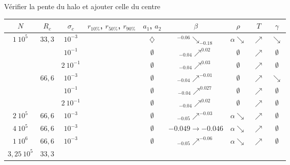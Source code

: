 \begin{table}[htbp]
	Vérifier la pente du halo et ajouter celle du centre
	\centering
		\begin{tabular}{|c|c|c|c|c|c|c|c|c|}
			\hline $N$ & $R_c$ & $\sigma_c$ & $r_{10\%}$, $r_{50\%}$, $r_{90\%}$ & $a_1$, $a_2$ & $\beta$ & $\rho$ & $T$ & $\gamma$ \tabularnewline
			\hline
			\hline \multirow{6}{*}{$1\ 10^5$} & \multirow{3}{*}{$33,3$}
					& $10^{-3}$ & \accretionmoyen{} & $\diamondsuit$ & ${}^{-0.06}\searrow_{-0.18}$ & $\alpha\searrow$ & $\nearrow$ & $\searrow$ \tabularnewline \cline{3-9}
					& & $10^{-1}$ & \accretionpeu{} & $\emptyset$ & ${}_{-0.04}\nearrow^{0.02}$ & $\emptyset$ & $\nearrow$ & $\emptyset$ \tabularnewline \cline{3-9}
					& & $2\ 10^{-1}$ & \accretionpeu{} & $\emptyset$ & ${}_{-0.04}\nearrow^{0.03}$ & $\emptyset$ & $\nearrow$ & $\emptyset$ \tabularnewline \cline{2-9}
				& \multirow{3}{*}{$66,6$}
					& $10^{-3}$ & \accretionpeu{} & $\emptyset$ & ${}_{-0.04}\nearrow^{-0.01}$ & $\emptyset$ & $\nearrow$ & $\searrow$ \tabularnewline \cline{3-9}
					& & $10^{-1}$ & \accretionpeu{} & $\emptyset$ & ${}_{-0.04}\nearrow^{0.027}$ & $\emptyset$ & $\nearrow$ & $\emptyset$ \tabularnewline \cline{3-9}
					& & $2\ 10^{-1}$ & \accretionpeu{} & $\emptyset$ & ${}_{-0.04}\nearrow^{0.02}$ & $\emptyset$ & $\nearrow$ & $\emptyset$ \tabularnewline \cline{2-9}
			\hline
			\hline $2\ 10^5$ & $66,6$ & $10^{-3}$ & \accretionpeu{} & $\emptyset$ & ${}_{-0.05}\nearrow^{-0.03}$ & $\alpha\searrow$ & $\nearrow$ & $\emptyset$ \\
			\hline
			\hline $4\ 10^5$ & $66,6$ & $10^{-3}$ & \accretionpeu{} & $\emptyset$ & ${\scriptstyle -0.049}\to{\scriptstyle -0.046}$ & $\alpha\searrow$ & $\nearrow$ & $\emptyset$ \\
			\hline
			\hline $1\ 10^6$ & $66,6$ & $10^{-3}$ & \accretionpeu{} & $\emptyset$ & ${}_{-0.05}\nearrow^{-0.06}$ & $\alpha\searrow$ & $\nearrow$ & $\emptyset$ \\
			\hline
			\hline \multirow{6}{*}{$3,25\ 10^5$} & \multirow{3}{*}{$33,3$}

\end{tabular}
\end{table}
